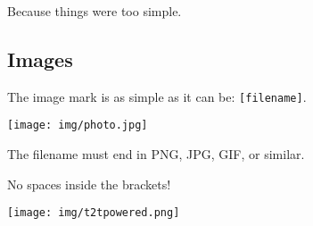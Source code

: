 \documentclass{article}
\begin{document}
Because things were too simple.

\subsection*{Images}

The image mark is as simple as it can be: \texttt{[filename]}.

\texttt{[image: img/photo.jpg]}

\begin{compactitem}
\item The filename must end in PNG, JPG, GIF, or similar.
\item No spaces inside the brackets!
\end{compactitem}

\hrulefill{}

\texttt{[image: img/t2tpowered.png]}

\end{document}
